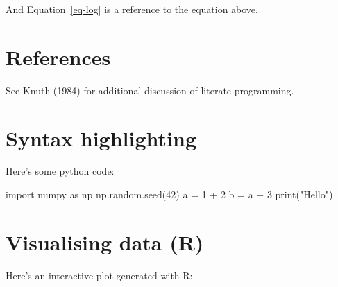 \documentclass[
  letterpaper,
  DIV=11,
  numbers=noendperiod]{scrreprt}
\newenvironment{Shaded}{\begin{snugshade}}{\end{snugshade}}
\newcommand{\BuiltInTok}[1]{\textcolor[rgb]{0.00,0.23,0.31}{#1}}
\newcommand{\DecValTok}[1]{\textcolor[rgb]{0.68,0.00,0.00}{#1}}
\newcommand{\ImportTok}[1]{\textcolor[rgb]{0.00,0.46,0.62}{#1}}
\newcommand{\NormalTok}[1]{\textcolor[rgb]{0.00,0.23,0.31}{#1}}
\newcommand{\OperatorTok}[1]{\textcolor[rgb]{0.37,0.37,0.37}{#1}}
\newcommand{\StringTok}[1]{\textcolor[rgb]{0.13,0.47,0.30}{#1}}
\theoremstyle{definition}
\theoremstyle{remark}
\begin{document}
And Equation~\ref{eq-log} is a reference to the equation above.

\section{References}\label{references-9}

See Knuth (1984) for additional discussion of literate programming.

\section{Syntax highlighting}\label{syntax-highlighting-9}

Here's some python code:

\begin{Shaded}
\begin{Highlighting}[]
\ImportTok{import}\NormalTok{ numpy }\ImportTok{as}\NormalTok{ np}
\NormalTok{np.random.seed(}\DecValTok{42}\NormalTok{)}
\NormalTok{a }\OperatorTok{=} \DecValTok{1} \OperatorTok{+} \DecValTok{2}
\NormalTok{b }\OperatorTok{=}\NormalTok{ a }\OperatorTok{+} \DecValTok{3}
\BuiltInTok{print}\NormalTok{(}\StringTok{"Hello"}\NormalTok{)}
\end{Highlighting}
\end{Shaded}

\section{Visualising data (R)}\label{visualising-data-r-9}

Here's an interactive plot generated with R:
\end{document}
